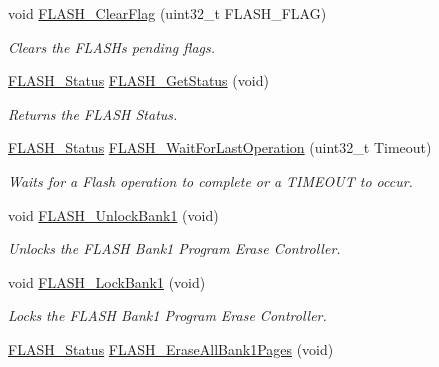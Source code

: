 \begin{DoxyCompactItemize}
void \hyperlink{group___f_l_a_s_h___exported___functions_gac4be1d486483fa5cd70ec77d44ca8f87}{F\+L\+A\+S\+H\+\_\+\+Clear\+Flag} (uint32\+\_\+t F\+L\+A\+S\+H\+\_\+\+F\+L\+AG)
\begin{DoxyCompactList}\small\item\em Clears the F\+L\+A\+SH\textquotesingle{}s pending flags. \end{DoxyCompactList}\item 
\hyperlink{group___f_l_a_s_h___exported___types_gadc63a6f3404ff1f71229a66915e9cdc0}{F\+L\+A\+S\+H\+\_\+\+Status} \hyperlink{group___f_l_a_s_h___exported___functions_gac265b8d1e7ea11e44ceee28797c3debb}{F\+L\+A\+S\+H\+\_\+\+Get\+Status} (void)
\begin{DoxyCompactList}\small\item\em Returns the F\+L\+A\+SH Status. \end{DoxyCompactList}\item 
\hyperlink{group___f_l_a_s_h___exported___types_gadc63a6f3404ff1f71229a66915e9cdc0}{F\+L\+A\+S\+H\+\_\+\+Status} \hyperlink{group___f_l_a_s_h___exported___functions_ga2ad803999ae93ec03700983c59cae264}{F\+L\+A\+S\+H\+\_\+\+Wait\+For\+Last\+Operation} (uint32\+\_\+t Timeout)
\begin{DoxyCompactList}\small\item\em Waits for a Flash operation to complete or a T\+I\+M\+E\+O\+UT to occur. \end{DoxyCompactList}\item 
void \hyperlink{group___f_l_a_s_h___exported___functions_ga358c4b7e0ef20693ca62cc9d20c94a5a}{F\+L\+A\+S\+H\+\_\+\+Unlock\+Bank1} (void)
\begin{DoxyCompactList}\small\item\em Unlocks the F\+L\+A\+SH Bank1 Program Erase Controller. \end{DoxyCompactList}\item 
void \hyperlink{group___f_l_a_s_h___exported___functions_gafe4188ab9eb12c046970660f65a3faf9}{F\+L\+A\+S\+H\+\_\+\+Lock\+Bank1} (void)
\begin{DoxyCompactList}\small\item\em Locks the F\+L\+A\+SH Bank1 Program Erase Controller. \end{DoxyCompactList}\item 
\hyperlink{group___f_l_a_s_h___exported___types_gadc63a6f3404ff1f71229a66915e9cdc0}{F\+L\+A\+S\+H\+\_\+\+Status} \hyperlink{group___f_l_a_s_h___exported___functions_ga2036728450ee18e789b25fe3fd9c80ee}{F\+L\+A\+S\+H\+\_\+\+Erase\+All\+Bank1\+Pages} (void)

\end{DoxyCompactItemize}

